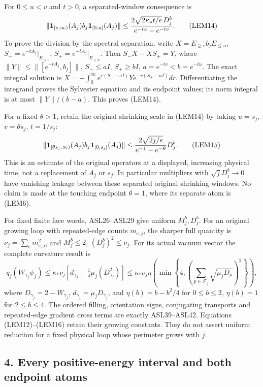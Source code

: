 \documentclass[11pt]{article}
\begin{document}
For \(0\le u<v\) and \(t>0\), a separated-window consequence is
\[
 \|\mathbf1_{[v,\infty)}(A_j)b_j\mathbf1_{[0,u]}(A_j)\|
 \le {2\sqrt{2\kappa_*t/e}\,D_j^b\over e^{-tu}-e^{-tv}}.
 \tag{LEM14}
\]
To prove the division by the spectral separation, write \(X=E_{\ge v}b_jE_{\le u}\), \(S_-=e^{-tA_j}|_{E_{\ge v}}\), \(S_+=e^{-tA_j}|_{E_{\le u}}\). Then \(S_-X-XS_+=Y\), where \(\|Y\|\le\|[e^{-tA_j},b_j]\|\), \(S_-\le aI\), \(S_+\ge bI\), \(a=e^{-tv}<b=e^{-tu}\). The exact integral solution is
\(X=-\int_0^\infty e^{r(S_--aI)}Y e^{-r(S_+-aI)}dr\).
Differentiating the integrand proves the Sylvester equation and its endpoint values; its norm integral is at most \(\|Y\|/(b-a)\). This proves (LEM14).

For a fixed \(\theta>1\), retain the original shrinking scale in (LEM14) by taking \(u=s_j\), \(v=\theta s_j\), \(t=1/s_j\):
\[
 \|\mathbf1_{[\theta s_j,\infty)}(A_j)b_j\mathbf1_{[0,s_j]}(A_j)\|
 \le {2\sqrt{2j/e}\over e^{-1}-e^{-\theta}}D_j^b.
 \tag{LEM15}
\]
This is an estimate of the original operators at a displayed, increasing physical time, not a replacement of \(A_j\) or \(s_j\). In particular multipliers with \(\sqrt jD_j^b\to0\) have vanishing leakage between these separated original shrinking windows. No claim is made at the touching endpoint \(\theta=1\), where its separate atom is (LEM6).

For fixed finite face words, ASL26–ASL29 give uniform \(M_j^b,D_j^b\). For an original growing loop with repeated-edge counts \(m_{e,j}\), the sharper full quantity is \(\nu_j=\sum_em_{e,j}^2\), and \(M_j^b\le2\), \((D_j^b)^2\le\nu_j\). For its actual vacuum vector the complete curvature result is
\[
 q_j(W_{\gamma_j}\psi_j)
 \le\kappa_*\nu_j\left[d_{\gamma_j}-\tfrac14\mu_j(D_{\gamma_j}^2)\right]
 \le\kappa_*\nu_j\eta\left(\min\left\{4,
       (\sum_{p\in\mathcal F_j}\sqrt{\mu_jD_p})^2\right\}\right),
 \tag{LEM16}
\]
where \(D_{\gamma_j}=2-W_{\gamma_j}\), \(d_{\gamma_j}=\mu_jD_{\gamma_j}\), and \(\eta(b)=b-b^2/4\) for \(0\le b\le2\), \(\eta(b)=1\) for \(2\le b\le4\). The ordered filling, orientation signs, conjugating transports and repeated-edge gradient cross terms are exactly ASL39–ASL42. Equations (LEM12)–(LEM16) retain their growing constants. They do not assert uniform reduction for a fixed physical loop whose perimeter grows with \(j\).

\subsection*{4. Every positive-energy interval and both endpoint atoms}
\end{document}
